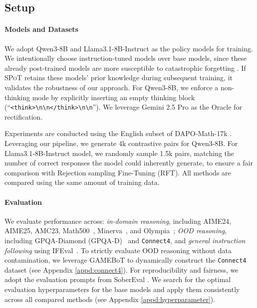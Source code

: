 \documentclass{article}
\newcommand{\methodName}{{\textsc{SPoT}}\xspace}
\theoremstyle{plain}
\theoremstyle{definition}
\theoremstyle{remark}
\begin{document}
\subsection{Setup}
\paragraph{Models and Datasets}
We adopt Qwen3-8B and Llama3.1-8B-Instruct as the policy models for training. We intentionally choose instruction-tuned models over base models, since these already post-trained models are more susceptible to catastrophic forgetting \citep{lu2025onpolicydistillation}. If \methodName retains these models' prior knowledge during subsequent training, it validates the robustness of our approach. For Qwen3-8B, we enforce a non-thinking mode by explicitly inserting an empty thinking block (``\verb|<think>\n\n</think>\n\n|''). We leverage Gemini 2.5 Pro as the Oracle for rectification.

Experiments are conducted using the English subset of DAPO-Math-17k \cite{yu2025dapo}. Leveraging our pipeline, we generate 4k contrastive pairs for Qwen3-8B. For Llama3.1-8B-Instruct model, we randomly sample 1.5k pairs, matching the number of correct responses the model could inherently generate, to ensure a fair comparison with Rejection sampling Fine-Tuning (RFT). All methods are compared using the same amount of training data.


\paragraph{Evaluation}
   We evaluate performance across: \textit{in-domain reasoning}, including AIME24, AIME25, AMC23, Math500~\citep{hendrycks2measuring}, Minerva~\citep{lewkowycz2022solving}, and Olympia~\cite{he2024olympiadbench}; \textit{OOD reasoning}, including GPQA-Diamond (GPQA-D)~\citep{rein2024gpqa} and \texttt{Connect4}, and \textit{general instruction following} using IFEval~\citep{zhou2023instruction}. To strictly evaluate OOD reasoning without data contamination, we leverage GAMEBoT \cite{lin2025gamebot} to dynamically construct the \texttt{Connect4} dataset (see Appendix \ref{appd:connect4}). For reproducibility and fairness, we adopt the evaluation prompts from SoberEval \citep{hochlehnert2025soberreasoning}. We search for the optimal evaluation hyperparameters for the base models and apply them consistently across all compared methods (see Appendix \ref{appd:hyperparameter}).



\end{document}
